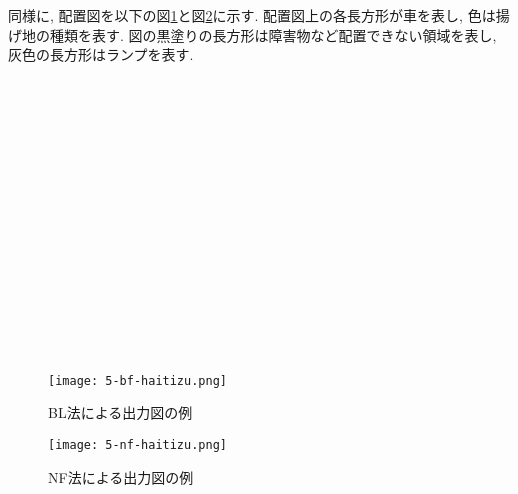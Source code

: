 同様に, 配置図を以下の図\ref{bl-no-rei}と図\ref{nf-no-rei}に示す. 
配置図上の各長方形が車を表し, 色は揚げ地の種類を表す. 
図の黒塗りの長方形は障害物など配置できない領域を表し, 灰色の長方形はランプを表す. \\ 
\\ \\ \\ \\ \\ \\ \\ \\ \\ \\ \\ \\ \\ 
\\ \\  



\begin{figure}[h]
    \hspace{2cm}
    \texttt{[image: 5-bf-haitizu.png]}
    \caption{BL法による出力図の例}
    \label{bl-no-rei}
\end{figure}


\begin{figure}[b]
    \hspace{2cm}
    \texttt{[image: 5-nf-haitizu.png]}
    \caption{NF法による出力図の例}
    \label{nf-no-rei}
\end{figure}

